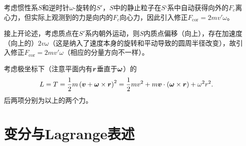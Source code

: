 \documentclass{ctexrep}
\begin{document}
考虑惯性系$S$和逆时针$\omega$-旋转的$S'$，$S$中的静止粒子在$S‘$系中自动获得向外的$F_c$离心力，但实际上观测到的力是向内的$F_c$向心力，因此引入修正$F_{\text{cor}} = 2mv'\omega$。
\par
接上开论述，考虑质点在$S'$系内朝外运动，则$S$内质点偏移（向上），存在加速度（向上的）$2v\omega$（这是纳入了速度本身的旋转和平动导致的圆周半径改变），故引入修正$F_{\text{cor}}=2mv'\omega$（相应的分量方向不一样）。
\par
考虑极坐标下（注意平面内有$\boldsymbol{r}$垂直于$\boldsymbol{\omega}$）的
\[ L = T = \frac{1}{2} m\left(\boldsymbol{v} + \boldsymbol{\omega}\times\boldsymbol{r}\right)^2 = \frac{1}{2} mv^2 + m\boldsymbol{v}\cdot\left(\boldsymbol{\omega}\times\boldsymbol{r}\right) + \omega^2 r^2. \]
后两项分别为以上的两个力。
\conclu{
  \[ \vF_\text{cor}=2m\vv\times\vomega, \]
  \[ \vF_c = mr\omega^2. \]
}
\section{变分与Lagrange表述}
\end{document}
